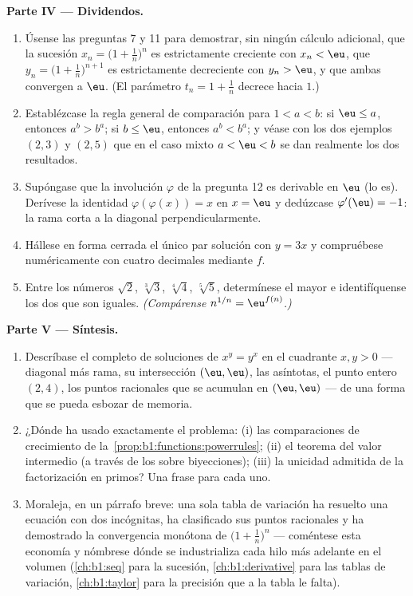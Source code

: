 \begin{problem}
\medskip
\noindent\textbf{Parte IV --- Dividendos.}
\begin{enumerate}[resume]
  \item Úsense las preguntas 7 y 11 para demostrar, sin ningún cálculo
        adicional, que la sucesión $x_n = \bigl(1 + \frac1n\bigr)^n$ es
        estrictamente creciente con $x_n < \eu$, que
        $y_n = \bigl(1 + \frac1n\bigr)^{n+1}$ es estrictamente
        decreciente con $y_n > \eu$, y que ambas convergen a $\eu$. (El
        parámetro $t_n = 1 + \frac1n$ decrece hacia $1$.)
  \item Establézcase la regla general de comparación para $1 < a < b$:
        si $\eu \leq a$, entonces $a^b > b^a$; si $b \leq \eu$,
        entonces $a^b < b^a$; y véase con los dos ejemplos $(2, 3)$ y
        $(2, 5)$ que en el caso mixto $a < \eu < b$ se dan realmente
        los dos resultados.
  \item Supóngase que la involución $\varphi$ de la pregunta 12 es
        derivable en $\eu$ (lo es). Derívese la identidad
        $\varphi(\varphi(x)) = x$ en $x = \eu$ y dedúzcase
        $\varphi'(\eu) = -1$: la rama corta a la diagonal
        perpendicularmente.
  \item Hállese en forma cerrada el único par solución con $y = 3x$ y
        compruébese numéricamente con cuatro decimales mediante $f$.
  \item Entre los números $\sqrt2$, $\sqrt[3]3$, $\sqrt[4]4$,
        $\sqrt[5]5$, determínese el mayor e identifíquense los dos que
        son iguales. \emph{(Compárense $n^{1/n} = \eu^{f(n)}$.)}
\end{enumerate}

\medskip
\noindent\textbf{Parte V --- Síntesis.}
\begin{enumerate}[resume]
  \item Descríbase el  completo de soluciones de $x^y = y^x$
        en el cuadrante $x, y > 0$ --- diagonal más rama, su
        intersección $(\eu, \eu)$, las asíntotas, el punto entero
        $(2, 4)$, los puntos racionales que se acumulan en
        $(\eu, \eu)$ --- de una forma que se pueda esbozar de memoria.
  \item ¿Dónde ha usado exactamente el problema: (i) las
        comparaciones de crecimiento de
        la~\cref{prop:b1:functions:powerrules}; (ii) el teorema del
        valor intermedio (a través de los  sobre biyecciones);
        (iii) la unicidad admitida de la factorización en primos? Una
        frase para cada uno.
  \item Moraleja, en un párrafo breve: una sola tabla de variación ha
        resuelto una ecuación con dos incógnitas, ha clasificado sus
        puntos racionales y ha demostrado la convergencia monótona de
        $\bigl(1 + \frac1n\bigr)^n$ --- coméntese esta economía y
        nómbrese dónde se industrializa cada hilo más adelante en el
        volumen (\cref{ch:b1:seq} para la sucesión,
        \cref{ch:b1:derivative} para las tablas de variación,
        \cref{ch:b1:taylor} para la precisión que a la tabla le falta).
\end{enumerate}
\end{problem}
